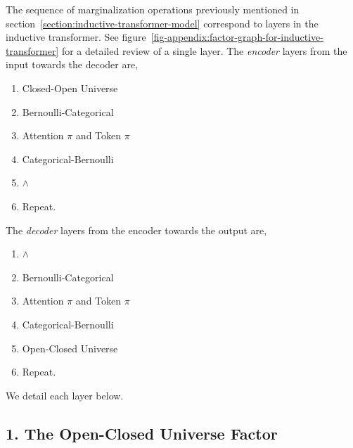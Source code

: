 \documentclass{article}
\begin{document}
The sequence of marginalization operations previously mentioned in section~\ref{section:inductive-transformer-model} correspond to layers in the inductive transformer. See figure~\ref{fig-appendix:factor-graph-for-inductive-transformer} for a detailed review of a single layer.
 The \emph{encoder} layers from the input towards the decoder are,
 
\begin{enumerate}
    \setlength\itemsep{0em}
    \item Closed-Open Universe
    \item Bernoulli-Categorical
    \item Attention $\pi$ and Token $\pi$
    \item Categorical-Bernoulli
    \item $\land$
    \item Repeat.
\end{enumerate}

The \emph{decoder} layers from the encoder towards the output are,
\begin{enumerate}
    \setlength\itemsep{0em}
    \item $\land$
    \item Bernoulli-Categorical
    \item Attention $\pi$ and Token $\pi$
    \item Categorical-Bernoulli
    \item Open-Closed Universe
    \item Repeat.
\end{enumerate}

We detail each layer below.

\subsection{1. The Open-Closed Universe Factor}\label{section:open-closed-universe}
 
\end{document}
